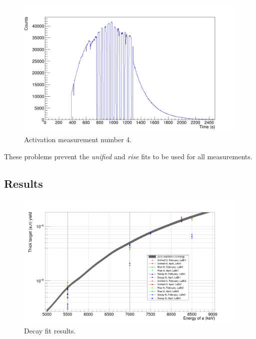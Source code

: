 \documentclass[a4paper,12pt]{report}
\begin{document}
\begin{figure}[H]
	\centering
	\includegraphics[width=\textwidth]{activation_4_time.png}
	\caption{Activation measurement number 4.}
	\label{activation_4_time}
\end{figure}

These problems prevent the \textit{unified} and \textit{rise} fits to be used for all measurements.
\\

\subsection{Results}

\begin{figure}[H]
	\centering
	\includegraphics[width=\textwidth]{reactions_v_energy_decay.png}
	\caption{Decay fit results.}
	\label{reactions_v_energy_decay}
\end{figure}
\end{document}

